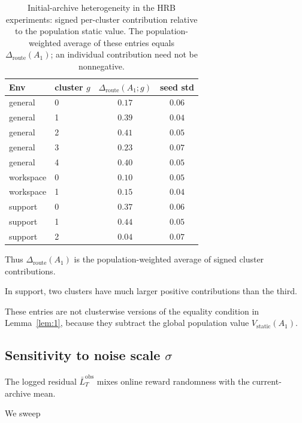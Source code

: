 \documentclass{article} %
\begin{document}
\begin{table}[h]
\centering
\footnotesize
\setlength{\tabcolsep}{4pt}
\caption{Initial-archive heterogeneity in the HRB experiments: signed
per-cluster contribution relative to the population static value.
The population-weighted average of these entries equals
\(\Delta_{\mathrm{route}}(A_1)\); an individual contribution need not be
nonnegative.}
\label{tab:app-per-cluster}
\begin{tabular}{llcc}
\toprule
Env & cluster $g$ & $\Delta_{\mathrm{route}}(A_1;g)$ & seed std \\
\midrule
general    & 0 & $0.17$ & $0.06$ \\
general    & 1 & $0.39$ & $0.04$ \\
general    & 2 & $0.41$ & $0.05$ \\
general    & 3 & $0.23$ & $0.07$ \\
general    & 4 & $0.40$ & $0.05$ \\
\midrule
workspace  & 0 & $0.10$ & $0.05$ \\
workspace  & 1 & $0.15$ & $0.04$ \\
\midrule
support    & 0 & $0.37$ & $0.06$ \\
support    & 1 & $0.44$ & $0.05$ \\
support    & 2 & $0.04$ & $0.07$ \\
\bottomrule
\end{tabular}

\end{table}

Thus \(\Delta_{\mathrm{route}}(A_1)\) is the population-weighted average of
signed cluster contributions.

In support, two clusters have much larger positive contributions than the
third.

These entries are not clusterwise versions of the equality condition in
Lemma~\ref{lem:1}, because they subtract the global population value
\(V_{\mathrm{static}}(A_1)\).

\subsection{\texorpdfstring{Sensitivity to noise scale $\sigma$}{Sensitivity to noise scale sigma}}

\label{app:sigma-sweep}

The logged residual \(\bar L_T^{\mathrm{obs}}\) mixes online reward randomness
with the current-archive mean.

We sweep
\end{document}
